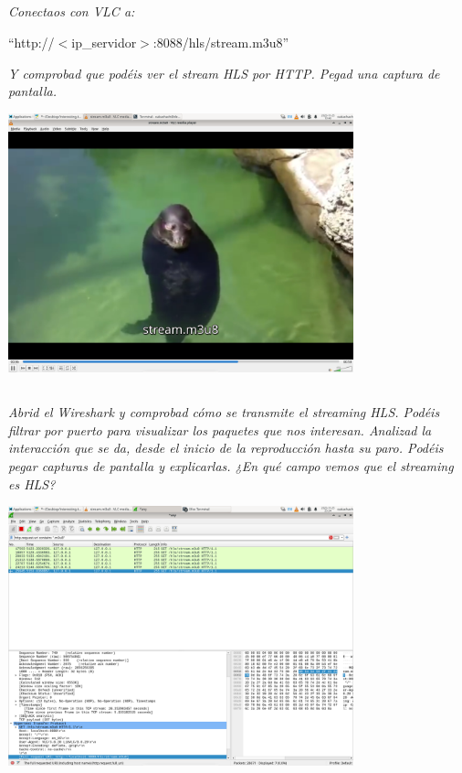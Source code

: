 \documentclass[spanish]{article}
\begin{document}
\subsection{}

\textit{Conectaos con VLC a:}

\begin{center}
``http://\(<\)ip\_servidor\(>\):8088/hls/stream.m3u8''
\end{center}

\textit{Y comprobad que podéis ver el stream HLS por HTTP. Pegad una
captura de pantalla.}

\begin{center}
\includegraphics[width=10cm]{../img/14.png}
\end{center}

\newpage

\subsection{}

\textit{Abrid el Wireshark y comprobad cómo se transmite el
streaming HLS. Podéis filtrar por puerto para
visualizar los paquetes que nos interesan. Analizad la
interacción que se da, desde el inicio de la reproducción
hasta su paro. Podéis pegar capturas de pantalla y
explicarlas. ¿En qué campo vemos que el streaming es HLS?}\\

\begin{center}
\includegraphics[width=10cm]{../img/16.png}
\end{center}
\end{document}
